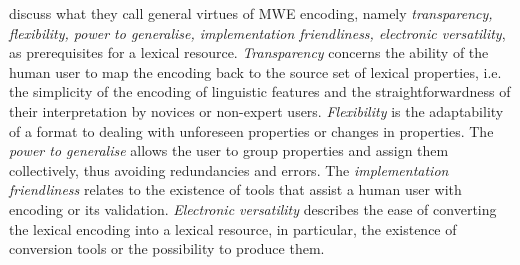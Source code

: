 \documentclass[output=paper,colorlinks,citecolor=brown]{langscibook}
\begin{document}
\citet{lichte-etal} discuss what they call general virtues of MWE encoding, namely \textit{transparency, flexibility, power to generalise, implementation friendliness, electronic versatility}, as prerequisites for a lexical resource. \textit{Transparency} concerns the ability of the human user to map the encoding back to the source set of lexical properties, i.e. the simplicity %
of the encoding of linguistic features and the straightforwardness of their interpretation by novices or non-expert users. \textit{Flexibility} is the adaptability of a format to dealing with unforeseen properties or changes in properties. %
The \textit{power to generalise} allows the user to group properties and assign them collectively, thus avoiding redundancies and errors. The \textit{implementation friendliness} relates to the existence of tools that assist a human user with encoding or its validation. %
\textit{Electronic versatility} describes the ease of converting the lexical encoding into a
lexical resource, in particular, %
the existence of conversion tools or the possibility to produce them. %
\largerpage
\end{document}
